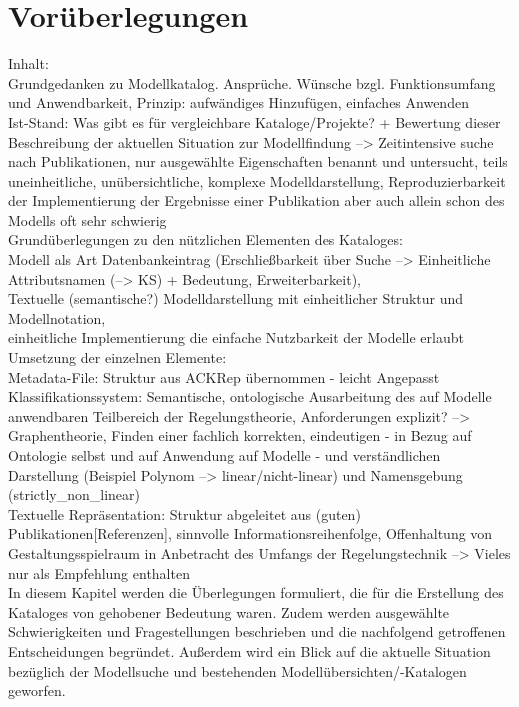 \chapter{Vorüberlegungen}
Inhalt:\\
Grundgedanken zu Modellkatalog. Ansprüche. Wünsche bzgl. Funktionsumfang und Anwendbarkeit, Prinzip: aufwändiges Hinzufügen, einfaches Anwenden \\
Ist-Stand: Was gibt es für vergleichbare Kataloge/Projekte? + Bewertung dieser\\
Beschreibung der aktuellen Situation zur Modellfindung --> Zeitintensive suche nach Publikationen, nur ausgewählte Eigenschaften benannt und untersucht, teils uneinheitliche, unübersichtliche, komplexe Modelldarstellung, Reproduzierbarkeit der Implementierung der Ergebnisse einer Publikation aber auch allein schon des Modells oft sehr schwierig \\
Grundüberlegungen zu den nützlichen Elementen des Kataloges: \\ Modell als Art Datenbankeintrag (Erschließbarkeit über Suche --> Einheitliche Attributsnamen (--> KS) + Bedeutung, Erweiterbarkeit), \\ Textuelle (semantische?) Modelldarstellung mit einheitlicher Struktur und Modellnotation, \\einheitliche Implementierung die einfache Nutzbarkeit der Modelle erlaubt \\
Umsetzung der einzelnen Elemente: \\
Metadata-File: Struktur aus ACKRep übernommen - leicht Angepasst \\
Klassifikationssystem: Semantische, ontologische Ausarbeitung des auf Modelle anwendbaren Teilbereich der Regelungstheorie, Anforderungen explizit? --> Graphentheorie, Finden einer fachlich korrekten, eindeutigen - in Bezug auf Ontologie selbst und auf Anwendung auf Modelle - und verständlichen Darstellung (Beispiel Polynom --> linear/nicht-linear) und Namensgebung (strictly\_non\_linear)\\ 
Textuelle Repräsentation: Struktur abgeleitet aus (guten) Publikationen[Referenzen], sinnvolle Informationsreihenfolge, Offenhaltung von Gestaltungsspielraum in Anbetracht des Umfangs der Regelungstechnik --> Vieles nur als Empfehlung enthalten \\ 
  
In diesem Kapitel werden die Überlegungen formuliert, die für die Erstellung des Kataloges von gehobener Bedeutung waren. Zudem werden ausgewählte Schwierigkeiten und Fragestellungen beschrieben und die nachfolgend getroffenen Entscheidungen begründet. Außerdem wird ein Blick auf die aktuelle Situation bezüglich der Modellsuche und bestehenden Modellübersichten/-Katalogen geworfen.

